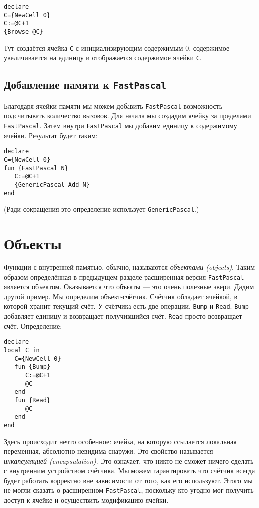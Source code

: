 \begin{lstlisting}
declare
C={NewCell 0}
C:=@C+1
{Browse @C}
\end{lstlisting}

Тут создаётся ячейка \lstinline|C| с инициализирующим содержимым $0$, содержимое увеличивается на единицу и отображается содержимое ячейки \lstinline|C|.

\subsection{Добавление памяти к \lstinline|FastPascal|}

Благодаря ячейки памяти мы можем добавить \lstinline|FastPascal| возможность подсчитывать количество вызовов. Для начала мы создадим ячейку за пределами \lstinline|FastPascal|. Затем внутри \lstinline|FastPascal| мы добавим единицу к содержимому ячейки. Результат будет таким:

\begin{lstlisting}
declare
C={NewCell 0}
fun {FastPascal N}
   C:=@C+1
   {GenericPascal Add N}
end
\end{lstlisting}

(Ради сокращения это определение использует \lstinline|GenericPascal|.)

\section{Объекты}

Функции с внутренней памятью, обычно, называются \emph{объектами (objects)}. Таким образом определённая в предыдущем разделе расширенная версия \lstinline|FastPascal| является объектом. Оказывается что объекты --- это очень полезные звери. Дадим другой пример. Мы определим объект-счётчик. Счётчик обладает ячейкой, в которой хранит текущий счёт. У счётчика есть две операции, \lstinline|Bump| и \lstinline|Read|. \lstinline|Bump| добавляет единицу и возвращает получившийся счёт. \lstinline|Read| просто возвращает счёт. Определение:

\begin{lstlisting}
declare
local C in
   C={NewCell 0}
   fun {Bump}
      C:=@C+1
      @C
   end
   fun {Read}
      @C
   end
end
\end{lstlisting}

Здесь происходит нечто особенное: ячейка, на которую ссылается локальная переменная, абсолютно невидима снаружи. Это свойство называется \emph{инкапсуляцией (encapsulation)}. Это означает, что никто не сможет ничего сделать с внутренним устройством счётчика. Мы можем гарантировать что счётчик всегда будет работать корректно вне зависимости от того, как его используют. Этого мы не могли сказать о расширенном \lstinline|FastPascal|, поскольку кто угодно мог получить доступ к ячейке и осуществить модификацию ячейки.

